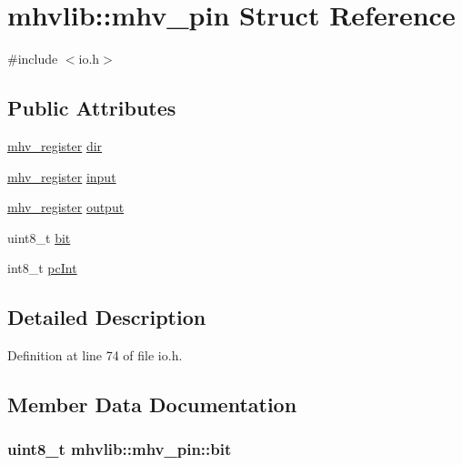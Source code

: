 \hypertarget{structmhvlib_1_1mhv__pin}{\section{mhvlib\-:\-:mhv\-\_\-pin Struct Reference}
\label{structmhvlib_1_1mhv__pin}
}


{\ttfamily \#include $<$io.\-h$>$}

\subsection*{Public Attributes}
\begin{DoxyCompactItemize}
\item 
\hyperlink{namespacemhvlib_a0c171f0b162817f27df6c10c611a0f37}{mhv\-\_\-register} \hyperlink{structmhvlib_1_1mhv__pin_a4cdeb5c913db830d7041d8588f0220b4}{dir}
\item 
\hyperlink{namespacemhvlib_a0c171f0b162817f27df6c10c611a0f37}{mhv\-\_\-register} \hyperlink{structmhvlib_1_1mhv__pin_a714e8ba9089324e8aba7d0a93af2f126}{input}
\item 
\hyperlink{namespacemhvlib_a0c171f0b162817f27df6c10c611a0f37}{mhv\-\_\-register} \hyperlink{structmhvlib_1_1mhv__pin_a27aade45241ec98899980d32c3d75e43}{output}
\item 
uint8\-\_\-t \hyperlink{structmhvlib_1_1mhv__pin_a3d82e9fbfd47b2a3b0aa3554a30c71f0}{bit}
\item 
int8\-\_\-t \hyperlink{structmhvlib_1_1mhv__pin_a37fbac008573b56a6d8b286a147b59ea}{pc\-Int}
\end{DoxyCompactItemize}


\subsection{Detailed Description}


Definition at line 74 of file io.\-h.



\subsection{Member Data Documentation}
\hypertarget{structmhvlib_1_1mhv__pin_a3d82e9fbfd47b2a3b0aa3554a30c71f0}{
\subsubsection[{bit}]{\setlength{\rightskip}{0pt plus 5cm}uint8\-\_\-t mhvlib\-::mhv\-\_\-pin\-::bit}}\label{structmhvlib_1_1mhv__pin_a3d82e9fbfd47b2a3b0aa3554a30c71f0}


